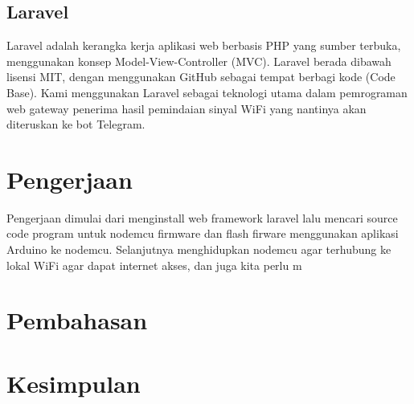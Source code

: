 \documentclass[conference]{IEEEtran}
\begin{document}
\subsection{Laravel}
Laravel adalah kerangka kerja aplikasi web berbasis PHP yang sumber terbuka, menggunakan konsep Model-View-Controller (MVC). Laravel berada dibawah lisensi MIT, dengan menggunakan GitHub sebagai tempat berbagi kode (Code Base). Kami menggunakan Laravel sebagai teknologi utama dalam pemrograman web gateway penerima hasil pemindaian sinyal WiFi yang nantinya akan diteruskan ke bot Telegram.

\section{Pengerjaan}\label{pengerjaan}
Pengerjaan dimulai dari menginstall web framework laravel lalu mencari source code program untuk nodemcu firmware dan flash firware menggunakan aplikasi Arduino ke nodemcu. Selanjutnya menghidupkan nodemcu agar terhubung ke lokal WiFi agar dapat internet akses, dan juga kita perlu m

\section{Pembahasan}

\section{Kesimpulan}
\end{document}
